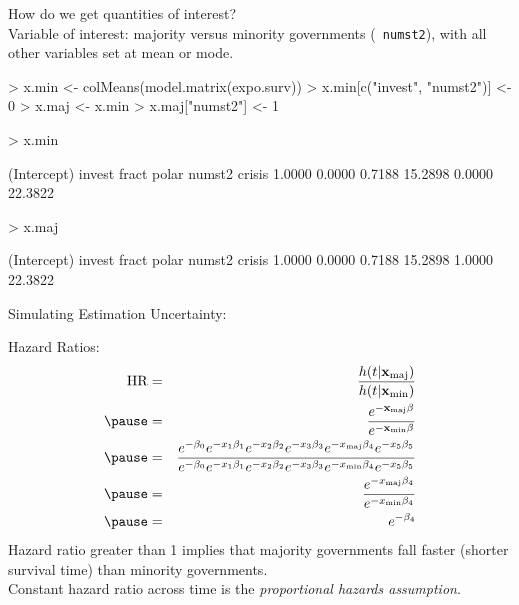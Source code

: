 \documentclass{beamer}
\begin{document}
\begin{frame}[fragile]
How do we get quantities of interest?\\
\pause
\bigskip
Variable of interest: majority versus minority governments ({\tt
numst2}), with all other variables set at mean or mode.\\
\pause
\tiny{
\bigskip
\begin{Schunk}
\begin{Sinput}
> x.min <- colMeans(model.matrix(expo.surv))
> x.min[c("invest", "numst2")] <- 0
> x.maj <- x.min
> x.maj["numst2"] <- 1
\end{Sinput}
\end{Schunk}
\pause
\begin{Schunk}
\begin{Sinput}
> x.min
\end{Sinput}
\begin{Soutput}
(Intercept)      invest       fract       polar      numst2      crisis 
     1.0000      0.0000      0.7188     15.2898      0.0000     22.3822 
\end{Soutput}
\begin{Sinput}
> x.maj
\end{Sinput}
\begin{Soutput}
(Intercept)      invest       fract       polar      numst2      crisis 
     1.0000      0.0000      0.7188     15.2898      1.0000     22.3822 
\end{Soutput}
\end{Schunk}
\bigskip
\normalsize
Simulating Estimation Uncertainty:
\pause
\tiny{
\begin{Schunk}
\end{Schunk}
}
}
\end{frame}

\begin{frame}[fragile]

\pause
\bigskip
\normalsize
Hazard Ratios:
\begin{eqnarray*}
\mathrm{HR} &=& \frac{h(t | \mathbf{x}_{\mathrm{maj}})}{h(t | \mathbf{x}_{\mathrm{min}})}\\
\pause
&=& \frac{e^{-\mathbf{x}_{\mathrm{maj}}\beta }}{e^{-\mathbf{x}_{\mathrm{min}}\beta }}\\
\pause
&=& \frac{e^{-\beta_0}e^{-x_1 \beta_1}e^{-x_2 \beta_2} e^{-x_3
\beta_3} e^{-x_{\mathrm{maj}} \beta_4} e^{-x_5 \beta_5}}{e^{-\beta_0}e^{-x_1 \beta_1}e^{-x_2 \beta_2} e^{-x_3
\beta_3} e^{-x_{\mathrm{min}} \beta_4} e^{-x_5 \beta_5}}\\
\pause
&=& \frac{e^{-x_{\mathrm{maj}} \beta_4}}{e^{-x_{\mathrm{min}} \beta_4}}\\
\pause
&=& e^{-\beta_4}
\end{eqnarray*}
\pause
Hazard ratio greater than 1 implies that majority governments fall
faster (shorter survival time) than minority governments.  \\
\pause 
\bigskip
Constant hazard ratio across time is the \emph{proportional hazards assumption}.
\end{frame}
\end{document}
